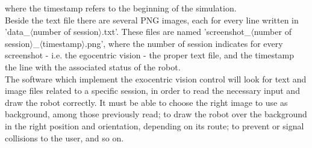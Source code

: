 where the timestamp refers to the beginning of the simulation.
\\
Beside the text file there are several PNG images, each for every 
line written in 'data\_$\langle$number of session$\rangle$.txt'. 
These files are named 'screenshot\_$\langle$number of 
session$\rangle$\_$\langle$timestamp$\rangle$.png', where the 
number of session indicates for every screenshot 
- i.e. the egocentric vision - the proper text file, and the 
timestamp the line with the associated status of the robot.
\\
The software which implement the exocentric vision control 
will look for text and image files related to a specific 
session, in order to read the necessary input and draw the 
robot correctly. It must be able to choose the right image 
to use as background, among those previously read; to draw 
the robot over the background in the right position and 
orientation, depending on its route; to prevent or signal 
collisions to the user, and so on.
